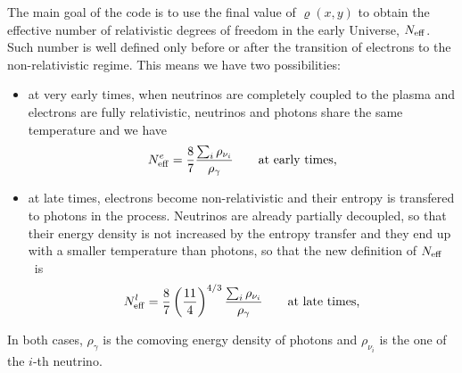 \documentclass[notitlepage,nofootinbib,showpacs,preprintnumbers,amsmath,amssymb,superscriptaddress,prd,onecolumn]{revtex4-1}
\newcommand{\Neff}{\ensuremath{N_{\rm eff}}}
\begin{document}
The main goal of the code is to use the final value of $\varrho(x,y)$ to obtain
the effective number of relativistic degrees of freedom in the early Universe, \Neff.
Such number is well defined only before or after
the transition of electrons to the non-relativistic regime.
This means we have two possibilities:
\begin{itemize}
 \item at very early times, when neutrinos are completely coupled to the plasma and electrons are fully relativistic, neutrinos and photons share the same temperature and we have
\begin{equation}
\Neff^e
=
\frac{8}{7}
\frac{\sum_i \rho_{\nu_i}}{\rho_\gamma}
\qquad\text{at early times,}
\end{equation}
\item at late times, electrons become non-relativistic and their entropy is transfered to photons in the process.
Neutrinos are already partially decoupled, so that their energy density is not increased by the entropy transfer
and they end up with a smaller temperature than photons,
so that the new definition of \Neff\ is
\begin{equation}
\Neff^l
=
\frac{8}{7}
\left(\frac{11}{4}\right)^{4/3}
\frac{\sum_i \rho_{\nu_i}}{\rho_\gamma}
\qquad\text{at late times,}
\end{equation}
\end{itemize}
In both cases,
$\rho_\gamma$ is the comoving energy density of photons and
$\rho_{\nu_i}$ is the one of the $i$-th neutrino.
\end{document}

